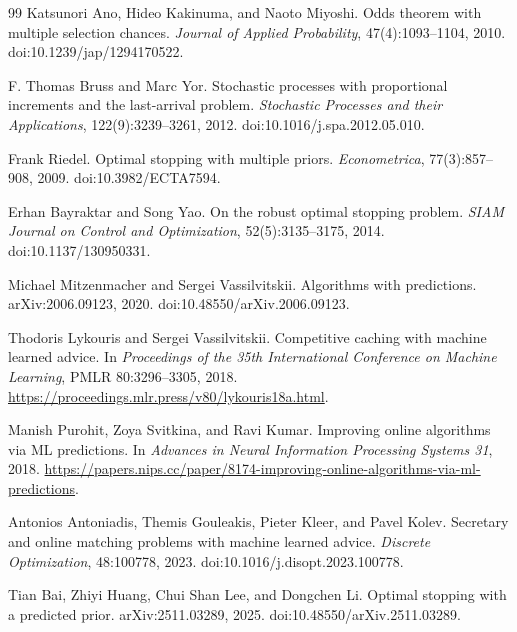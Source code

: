 \documentclass[11pt,a4paper]{article}
\begin{document}
\begin{thebibliography}{99}
Katsunori Ano, Hideo Kakinuma, and Naoto Miyoshi.
\newblock Odds theorem with multiple selection chances.
\newblock \emph{Journal of Applied Probability}, 47(4):1093--1104, 2010.
\newblock doi:10.1239/jap/1294170522.

F. Thomas Bruss and Marc Yor.
\newblock Stochastic processes with proportional increments and the
last-arrival problem.
\newblock \emph{Stochastic Processes and their Applications},
122(9):3239--3261, 2012.
\newblock doi:10.1016/j.spa.2012.05.010.

Frank Riedel.
\newblock Optimal stopping with multiple priors.
\newblock \emph{Econometrica}, 77(3):857--908, 2009.
\newblock doi:10.3982/ECTA7594.

Erhan Bayraktar and Song Yao.
\newblock On the robust optimal stopping problem.
\newblock \emph{SIAM Journal on Control and Optimization},
52(5):3135--3175, 2014.
\newblock doi:10.1137/130950331.

Michael Mitzenmacher and Sergei Vassilvitskii.
\newblock Algorithms with predictions.
\newblock arXiv:2006.09123, 2020.
\newblock doi:10.48550/arXiv.2006.09123.

Thodoris Lykouris and Sergei Vassilvitskii.
\newblock Competitive caching with machine learned advice.
\newblock In \emph{Proceedings of the 35th International Conference on Machine
Learning}, PMLR 80:3296--3305, 2018.
\newblock \url{https://proceedings.mlr.press/v80/lykouris18a.html}.

Manish Purohit, Zoya Svitkina, and Ravi Kumar.
\newblock Improving online algorithms via ML predictions.
\newblock In \emph{Advances in Neural Information Processing Systems 31},
2018.
\newblock \url{https://papers.nips.cc/paper/8174-improving-online-algorithms-via-ml-predictions}.

Antonios Antoniadis, Themis Gouleakis, Pieter Kleer, and Pavel Kolev.
\newblock Secretary and online matching problems with machine learned advice.
\newblock \emph{Discrete Optimization}, 48:100778, 2023.
\newblock doi:10.1016/j.disopt.2023.100778.

Tian Bai, Zhiyi Huang, Chui Shan Lee, and Dongchen Li.
\newblock Optimal stopping with a predicted prior.
\newblock arXiv:2511.03289, 2025.
\newblock doi:10.48550/arXiv.2511.03289.

\end{thebibliography}
\end{document}
